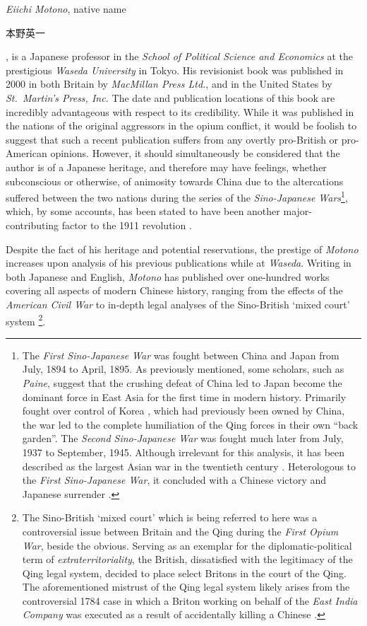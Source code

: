 \documentclass[a4paper,oneside]{article}
\newcommand{\jap}[1]{%
        \begin{CJK*}{UTF8}{min}%
                \normalfont%
                #1
        \end{CJK*}
}
\begin{document}
        \textit{Eiichi Motono}, native name \jap{本野英一}, is a Japanese professor in the \textit{School of Political Science and Economics} at the prestigious \textit{Waseda University} in Tokyo. His revisionist book was published in 2000 in both Britain by \textit{MacMillan Press Ltd.}, and in the United States by \textit{St.\ Martin's Press, Inc.} The date and publication locations of this book are incredibly advantageous with respect to its credibility. While it was published in the nations of the original aggressors in the opium conflict, it would be foolish to suggest that such a recent publication suffers from any overtly pro-British or pro-American opinions. However, it should simultaneously be considered that the author is of a Japanese heritage, and therefore may have feelings, whether subconscious or otherwise, of animosity towards China due to the altercations suffered between the two nations during the series of the \textit{Sino-Japanese Wars}\footnote{The \textit{First Sino-Japanese War} was fought between China and Japan from  July, 1894 to  April, 1895. As previously mentioned, some scholars, such as \textit{Paine}, suggest that the crushing defeat of China led to Japan become the dominant force in East Asia for the first time in modern history. Primarily fought over control of Korea \autocite{Olender:2014}, which had previously been owned by China, the war led to the complete humiliation of the Qing forces in their own ``back garden''. The \textit{Second Sino-Japanese War} was fought much later from  July, 1937 to  September, 1945. Although irrelevant for this analysis, it has been described as the largest Asian war in the twentieth century \autocite{Bix:1992}. Heterologous to the \textit{First Sino-Japanese War}, it concluded with a Chinese victory and Japanese surrender \autocite{Kitamura:2014}.}, which, by some accounts, has been stated to have been another major-contributing factor to the 1911 revolution \autocite{Paine:2009}.

        Despite the fact of his heritage and potential reservations, the prestige of \textit{Motono} increases upon analysis of his previous publications while at \textit{Waseda}. Writing in both Japanese and English, \textit{Motono} has published over one-hundred works covering all aspects of modern Chinese history, ranging from the effects of the \textit{American Civil War} \autocite{Motono:1984} to in-depth legal analyses of the Sino-British `mixed court' system \autocite{Motono:1996}\footnote{The Sino-British `mixed court' which is being referred to here was a controversial issue between Britain and the Qing during the \textit{First Opium War}, beside the obvious. Serving as an exemplar for the diplomatic-political term of \textit{extraterritoriality}, the British, dissatisfied with the legitimacy of the Qing legal system, decided to place select Britons in the court of the Qing. The aforementioned mistrust of the Qing legal system likely arises from the controversial 1784 case in which a Briton working on behalf of the \textit{East India Company} was executed as a result of accidentally killing a Chinese \autocite{Cassel:2012}.}.
\end{document}
